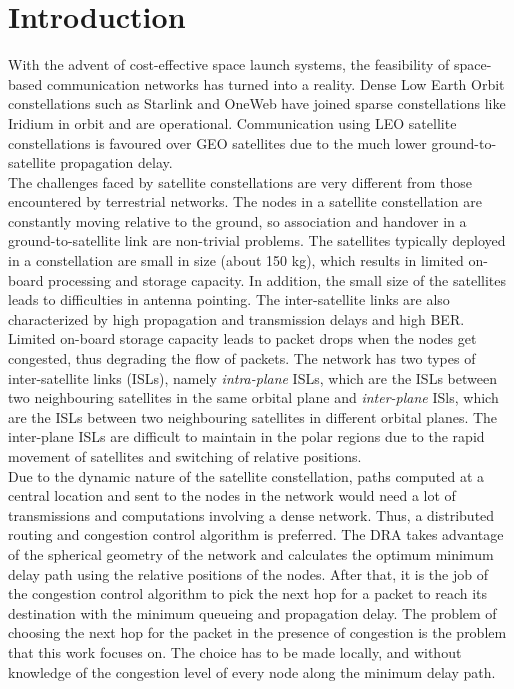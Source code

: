 \documentclass[10pt,conference, final, letterpaper]{IEEEtran}
\begin{document}
\section{Introduction}
With the advent of cost-effective space launch systems, the feasibility of space-based communication networks has turned into a reality. Dense Low Earth Orbit constellations such as Starlink and OneWeb have joined sparse constellations like Iridium in orbit and are operational. Communication using LEO satellite constellations is favoured over GEO satellites due to the much lower ground-to-satellite propagation delay. \\
The challenges faced by satellite constellations are very different from those encountered by terrestrial networks. The nodes in a satellite constellation are constantly moving relative to the ground, so association and handover in a ground-to-satellite link are non-trivial problems. The satellites typically deployed in a constellation are small in size (about 150 kg), which results in limited on-board processing and storage capacity. In addition, the small size of the satellites leads to difficulties in antenna pointing. The inter-satellite links are also characterized by high propagation and transmission delays and high BER. Limited on-board storage capacity leads to packet drops when the nodes get congested, thus degrading the flow of packets. The network has two types of inter-satellite links (ISLs), namely \textit{intra-plane} ISLs, which are the ISLs between two neighbouring satellites in the same orbital plane and \textit{inter-plane} ISls, which are the ISLs between two neighbouring satellites in different orbital planes. The inter-plane ISLs are difficult to maintain in the polar regions due to the rapid movement of satellites and switching of relative positions.\\
Due to the dynamic nature of the satellite constellation, paths computed at a central location and sent to the nodes in the network would need a lot of transmissions and computations involving a dense network. Thus, a distributed routing and congestion control algorithm is preferred. The DRA takes advantage of the spherical geometry of the network and calculates the optimum minimum delay path using the relative positions of the nodes. After that, it is the job of the congestion control algorithm to pick the next hop for a packet to reach its destination with the minimum queueing and propagation delay. The problem of choosing the next hop for the packet in the presence of congestion is the problem that this work focuses on. The choice has to be made locally, and without knowledge of the congestion level of every node along the minimum delay path.\\
\end{document}
